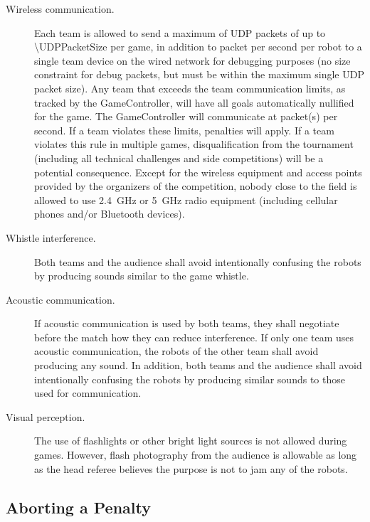 \begin{description}
  \item[Wireless communication.] Each team is allowed to send a maximum of \UDPPacketLimit{} UDP packets of up to \qty{\UDPPacketSize}{\byte} per game, in addition to \UDPDebugPacketRate{} packet per second per robot to a single team device on the wired network for debugging purposes (no size constraint for debug packets, but must be within the maximum single UDP packet size). Any team that exceeds the team communication limits, as tracked by the GameController, will have all goals automatically nullified for the game. The GameController will communicate at \GameControllerPacketRate{} packet(s) per second. If a team violates these limits, penalties will apply. If a team violates this rule in multiple games, disqualification from the tournament (including all technical challenges and side competitions) will be a potential consequence. Except for the wireless equipment and access points provided by the organizers of the competition, nobody close to the field is allowed to use \qty{2.4}{\giga\hertz} or \qty{5}{\giga\hertz} radio equipment (including cellular phones and/or Bluetooth devices).
  
  \item[Whistle interference.] Both teams and the audience shall avoid intentionally confusing the robots by producing sounds similar to the game whistle.
  
  \item[Acoustic communication.] If acoustic communication is used by both teams, they shall negotiate before the match how they can reduce interference. If only one team uses acoustic communication, the robots of the other team shall avoid producing any sound. In addition, both teams and the audience shall avoid intentionally confusing the robots by producing similar sounds to those used for communication.
  
  \item[Visual perception.] The use of flashlights or other bright light sources is not allowed during games. However, flash photography from the audience is allowable as long as the head referee believes the purpose is not to jam any of the robots.
\end{description}

\subsection{Aborting a Penalty}
\label{sec:aborting_penalty}

